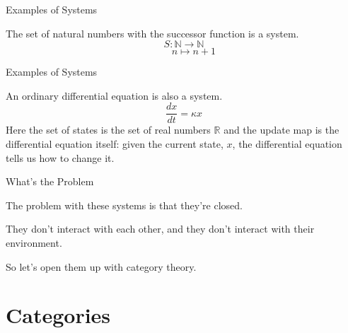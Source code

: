 \documentclass{beamer}
\begin{document}
\begin{frame}{Examples of Systems}
    \begin{large}
        The set of natural numbers with the successor function is a system.
        \vspace*{0.125in}
        \[
            S: \mathbb{N} \rightarrow \mathbb{N}
        \]
        \[
            \ \ \ \ \ \ \ \ \ n \mapsto n+1
        \]
    \end{large}
\end{frame}


\begin{frame}{Examples of Systems}
    \begin{large}
        An ordinary differential equation is also a system.
        \vspace*{0.125in}
        \[
            \frac{dx}{dt}=\kappa x
        \]
        Here the set of states is the set of real numbers $\mathbb{R}$ and the update map is the differential equation itself: given the current state, $x$, the differential equation tells us how to change it.

    \end{large}

\end{frame}


\begin{frame}{What's the Problem}
    \begin{large}
        The problem with these systems is that they're closed.

        \vspace*{0.25in}
        They don't interact with each other, and they don't interact with their environment.

        \vspace*{0.25in}
        So let's open them up with category theory.
    \end{large}

\end{frame}







\section{Categories}
\end{document}
